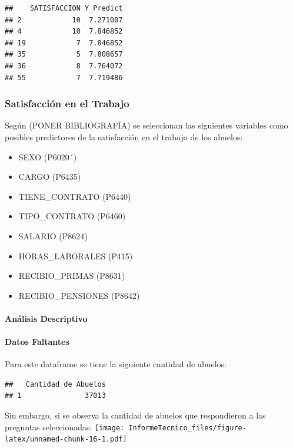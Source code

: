 \documentclass[
]{article}
\providecommand{\tightlist}{%
  \setlength{\itemsep}{0pt}\setlength{\parskip}{0pt}}
\begin{document}
\begin{verbatim}
##    SATISFACCION Y_Predict
## 2            10  7.271007
## 4            10  7.846852
## 19            7  7.846852
## 35            5  7.808657
## 36            8  7.764072
## 55            7  7.719486
\end{verbatim}

\hypertarget{satisfacciuxf3n-en-el-trabajo}{%
\subsubsection{Satisfacción en el
Trabajo}\label{satisfacciuxf3n-en-el-trabajo}}

Según (PONER BIBLIOGRAFÍA) se seleccionan las siguientes variables como
posibles predictores de la satisfacción en el trabajo de los abuelos:

\begin{itemize}
\tightlist
\item
  SEXO (P6020´)
\item
  CARGO (P6435)
\item
  TIENE\_CONTRATO (P6440)
\item
  TIPO\_CONTRATO (P6460)
\item
  SALARIO (P8624)
\item
  HORAS\_LABORALES (P415)
\item
  RECIBIO\_PRIMAS (P8631)
\item
  RECIBIO\_PENSIONES (P8642)
\end{itemize}

\hypertarget{anuxe1lisis-descriptivo-3}{%
\paragraph{Análisis Descriptivo}\label{anuxe1lisis-descriptivo-3}}

\hypertarget{datos-faltantes}{%
\paragraph{Datos Faltantes}\label{datos-faltantes}}

Para este dataframe se tiene la siguiente cantidad de abuelos:

\begin{verbatim}
##   Cantidad de Abuelos
## 1               37013
\end{verbatim}

Sin embargo, si se observa la cantidad de abuelos que respondieron a las
preguntas seleccionadas:
\texttt{[image: InformeTecnico\_files/figure-latex/unnamed-chunk-16-1.pdf]}
\end{document}
